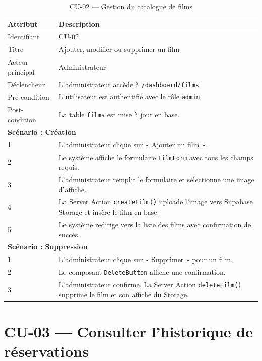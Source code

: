 \documentclass[12pt,a4paper,openany]{report}
\begin{document}
\begin{table}[H]
\centering
\begin{tabularx}{\textwidth}{lX}
\toprule
\textbf{Attribut} & \textbf{Description} \\
\midrule
Identifiant        & CU-02 \\
Titre              & Ajouter, modifier ou supprimer un film \\
Acteur principal   & Administrateur \\
Déclencheur        & L'administrateur accède à \texttt{/dashboard/films} \\
Pré-condition      & L'utilisateur est authentifié avec le rôle \texttt{admin}. \\
Post-condition     & La table \texttt{films} est mise à jour en base. \\
\midrule
\multicolumn{2}{l}{\textbf{Scénario : Création}} \\
\midrule
1 & L'administrateur clique sur « Ajouter un film ». \\
2 & Le système affiche le formulaire \texttt{FilmForm} avec tous les champs requis. \\
3 & L'administrateur remplit le formulaire et sélectionne une image d'affiche. \\
4 & La Server Action \texttt{createFilm()} uploade l'image vers Supabase Storage et insère le film en base. \\
5 & Le système redirige vers la liste des films avec confirmation de succès. \\
\midrule
\multicolumn{2}{l}{\textbf{Scénario : Suppression}} \\
\midrule
1 & L'administrateur clique sur « Supprimer » pour un film. \\
2 & Le composant \texttt{DeleteButton} affiche une confirmation. \\
3 & L'administrateur confirme. La Server Action \texttt{deleteFilm()} supprime le film et son affiche du Storage. \\
\bottomrule
\end{tabularx}
\caption{CU-02 — Gestion du catalogue de films}
\end{table}

\section{CU-03 — Consulter l'historique de réservations}
\end{document}
